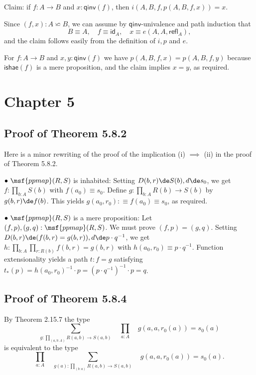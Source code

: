 \documentclass[12pt]{article}
\begin{document}
Claim: if $f:A\to B$ and $x:\mathsf{qinv}(f)$, then $i(A,B,f,p(A,B,f,x))=x$.
 
Since $(f,x):A\backsimeq B$, we can assume by $\mathsf{qinv}$-univalence and path induction that 
$$
B\equiv A,\quad f\equiv\mathsf{id}_A,\quad x\equiv e(A,A,\mathsf{refl}_A),
$$ 
and the claim follows easily from the definition of $i,p$ and $e$.

For $f:A\to B$ and $x,y:\mathsf{qinv}(f)$ we have $p(A,B,f,x)=p(A,B,f,y)$ because $\mathsf{ishae}(f)$ is a mere proposition, and the claim implies $x=y$, as required. 


\section{Chapter 5}

\subsection{Proof of Theorem 5.8.2}\label{582}

Here is a minor rewriting of the proof of the implication (i) $\implies$ (ii) in the proof of Theorem 5.8.2. 

\nn$\bullet\ \msf{ppmap}(R,S)$ is inhabited: Setting $D(b,r)\de S(b),d\de s_0$, we get $f:\prod_{b:A}S(b)$ with $f(a_0)\equiv s_0$. Define $g:\prod_{b:A}R(b)\to S(b)$ by $g(b,r)\de f(b)$. This yields $g(a_0,r_0):\equiv f(a_0)\equiv s_0$, as required. 

\nn$\bullet\ \msf{ppmap}(R,S)$ is a mere proposition: Let $(f,p),(g,q):\msf{ppmap}(R,S)$. We must prove $(f,p)=(g,q)$. Setting $D(b,r)\de(f(b,r)=g(b,r)),d\de p\cdot q^{-1}$, we get $h:\prod_{b:A}\prod_{r:R(b)}f(b,r)=g(b,r)$ with $h(a_0,r_0)\equiv p\cdot q^{-1}$. Function extensionality yields a path $t:f=g$ satisfying $t_*(p)=h(a_0,r_0)^{-1}\cdot p=(p\cdot q^{-1})^{-1}\cdot p=q$.%


\subsection{Proof of Theorem 5.8.4}

By Theorem 2.15.7 the type 
$$
\sum_{g:\prod_{(a,b:A)}R(a,b)\to S(a,b)}\quad\prod_{a:A}\quad g(a,a,r_0(a))=s_0(a)
$$ 
is equivalent to the type
$$
\prod_{a:A}\quad\sum_{g(a):\prod_{(b:a)}R(a,b)\to S(a,b)}\quad g(a,a,r_0(a))=s_0(a).
$$
\end{document}
